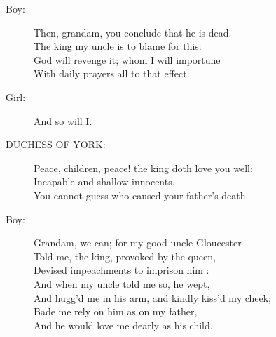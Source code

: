 \documentclass{article}
\begin{document}
\begin{description}
\item[Boy:] 
\hspace{1pt}Then, grandam, you conclude that he is dead.\\
\hspace{1pt}The king my uncle is to blame for this:\\
\hspace{1pt}God will revenge it; whom I will importune\\
\hspace{1pt}With daily prayers all to that effect.\\
\end{description}
\begin{description}
\item[Girl:] 
\hspace{1pt}And so will I.\\
\end{description}
\begin{description}
\item[DUCHESS OF YORK:] 
\hspace{1pt}Peace, children, peace! the king doth love you well:\\
\hspace{1pt}Incapable and shallow innocents,\\
\hspace{1pt}You cannot guess who caused your father's death.\\
\end{description}
\begin{description}
\item[Boy:] 
\hspace{1pt}Grandam, we can; for my good uncle Gloucester\\
\hspace{1pt}Told me, the king, provoked by the queen,\\
\hspace{1pt}Devised impeachments to imprison him :\\
\hspace{1pt}And when my uncle told me so, he wept,\\
\hspace{1pt}And hugg'd me in his arm, and kindly kiss'd my cheek;\\
\hspace{1pt}Bade me rely on him as on my father,\\
\hspace{1pt}And he would love me dearly as his child.\\
\end{description}
\end{document}
